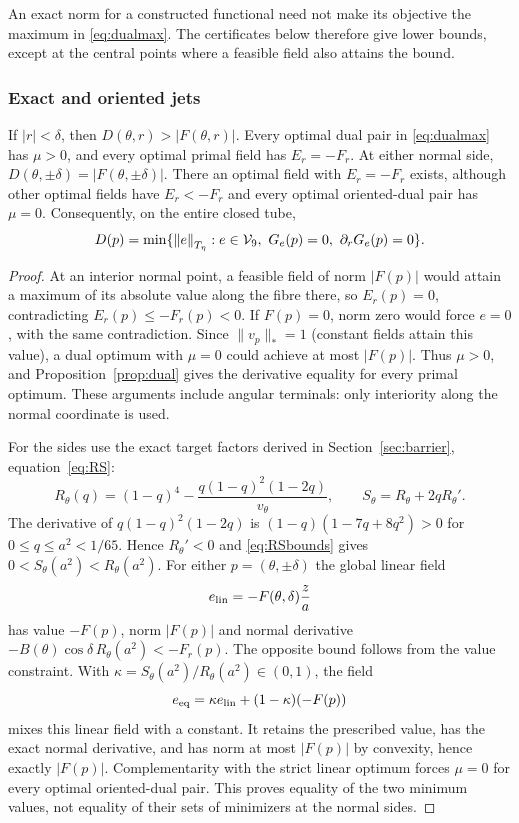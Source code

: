 \documentclass[11pt,a4paper]{article}
\begin{document}
An exact norm for a constructed functional need not make its objective
the maximum in \eqref{eq:dualmax}. The certificates below therefore give
lower bounds, except at the central points where a feasible field also
attains the bound.


\subsubsection{Exact and oriented jets}
\begin{proposition}\label{prop:exactjet}
If $|r|<\delta$, then $D(\theta,r)>|F(\theta,r)|$.
Every optimal dual pair in \eqref{eq:dualmax} has $\mu>0$,
and every optimal primal field has $E_r=-F_r$.
At either normal side, $D(\theta,\pm\delta)=|F(\theta,\pm\delta)|$.
There an optimal field with $E_r=-F_r$ exists, although other optimal
fields have $E_r<-F_r$ and every optimal oriented-dual pair has $\mu=0$.
Consequently, on the entire closed tube,
\begin{equation}\label{eq:exactjetcost}
 D(p)=\min\{\normT e:e\in\V,\ G_e(p)=0,\ \partial_rG_e(p)=0\}.
\end{equation}
\end{proposition}
\begin{proof}
At an interior normal point, a feasible field of norm $|F(p)|$ would
attain a maximum of its absolute value along the fibre there, so
$E_r(p)=0$, contradicting $E_r(p)\le-F_r(p)<0$. If $F(p)=0$,
norm zero would force $e=0$, with the same contradiction.
Since $\|v_p\|_*=1$ (constant fields attain this value), a dual
optimum with $\mu=0$ could achieve at most $|F(p)|$.
Thus $\mu>0$, and Proposition~\ref{prop:dual} gives the derivative
equality for every primal optimum. These arguments include angular
terminals: only interiority along the normal coordinate is used.

For the sides use the exact target factors derived in
Section~\ref{sec:barrier}, equation~\eqref{eq:RS}:
\[
 R_\theta(q)=(1-q)^4-\frac{q(1-q)^2(1-2q)}{v_\theta},
 \qquad S_\theta=R_\theta+2qR_\theta'.
\]
The derivative of $q(1-q)^2(1-2q)$ is
$(1-q)(1-7q+8q^2)>0$ for $0\le q\le a^2<1/65$.
Hence $R_\theta'<0$ and \eqref{eq:RSbounds} gives
$0<S_\theta(a^2)<R_\theta(a^2)$.
For either $p=(\theta,\pm\delta)$ the global linear field
\[
 e_{\rm lin}=-F(\theta,\delta)\frac za
\]
has value $-F(p)$, norm $|F(p)|$ and normal derivative
$-B(\theta)\cos\delta\,R_\theta(a^2)<-F_r(p)$.
The opposite bound follows from the value constraint. With
$\kappa=S_\theta(a^2)/R_\theta(a^2)\in(0,1)$, the field
\[
 e_{\rm eq}=\kappa e_{\rm lin}+(1-\kappa)(-F(p))
\]
mixes this linear field with a constant. It retains the prescribed value,
has the exact normal derivative, and has norm at most $|F(p)|$ by
convexity, hence exactly $|F(p)|$. Complementarity with the strict
linear optimum forces $\mu=0$ for every optimal oriented-dual pair.
This proves equality of the two minimum values, not equality of
their sets of minimizers at the normal sides.
\end{proof}
\end{document}
